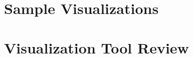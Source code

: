 \documentclass[12pt]{article}
\begin{document}
\section{Sample Visualizations}

\section{Visualization Tool Review}



\end{document}
